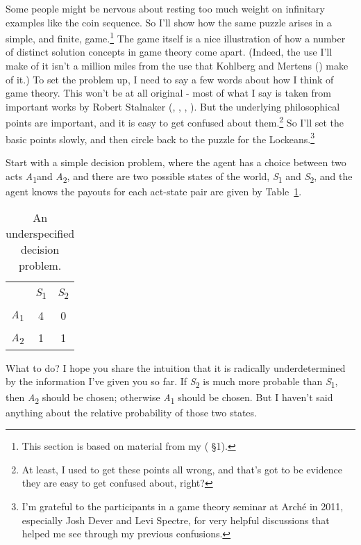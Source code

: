 \documentclass[
  10pt,
  letterpaper,
  twoside]{scrbook}
\begin{document}
Some people might be nervous about resting too much weight on infinitary
examples like the coin sequence. So I'll show how the same puzzle arises
in a simple, and finite, game.\footnote{This section is based on
  material from my ( §1).} The game
itself is a nice illustration of how a number of distinct solution
concepts in game theory come apart. (Indeed, the use I'll make of it
isn't a million miles from the use that Kohlberg and Mertens
() make of it.) To set the
problem up, I need to say a few words about how I think of game theory.
This won't be at all original - most of what I say is taken from
important works by Robert Stalnaker (,
, ,
). But the underlying philosophical
points are important, and it is easy to get confused about
them.\footnote{At least, I used to get these points all wrong, and
  that's got to be evidence they are easy to get confused about, right?}
So I'll set the basic points slowly, and then circle back to the puzzle
for the Lockeans.\footnote{I'm grateful to the participants in a game
  theory seminar at Arché in 2011, especially Josh Dever and Levi
  Spectre, for very helpful discussions that helped me see through my
  previous confusions.}

Start with a simple decision problem, where the agent has a choice
between two acts \emph{A}\textsubscript{1}and \emph{A}\textsubscript{2},
and there are two possible states of the world,
\emph{S}\textsubscript{1} and \emph{S}\textsubscript{2}, and the agent
knows the payouts for each act-state pair are given by
Table~\ref{tbl-underspecified}.

\begin{longtable}[]{@{}lcc@{}}
\caption{An underspecified decision
problem.}\label{tbl-underspecified}\tabularnewline
\toprule\noalign{}
\endfirsthead
\endhead
\bottomrule\noalign{}
\endlastfoot
& \emph{S}\textsubscript{1} & \emph{S}\textsubscript{2} \\
\emph{A}\textsubscript{1} & 4 & 0 \\
\emph{A}\textsubscript{2} & 1 & 1 \\
\end{longtable}

What to do? I hope you share the intuition that it is radically
underdetermined by the information I've given you so far. If
\emph{S}\textsubscript{2} is much more probable than
\emph{S}\textsubscript{1}, then \emph{A}\textsubscript{2} should be
chosen; otherwise \emph{A}\textsubscript{1} should be chosen. But I
haven't said anything about the relative probability of those two
states.
\end{document}

